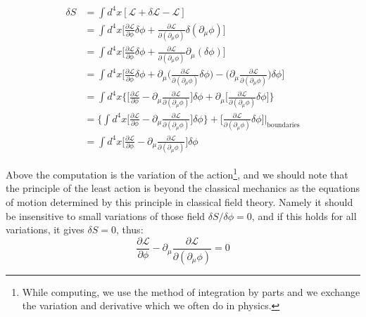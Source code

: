 \documentclass[12pt,openany]{book}
\begin{document}
	\begin{equation}\label{deltaS}
		\begin{aligned}
			\delta S&=\int d^4x [\mathcal{L}+\delta\mathcal{L}-\mathcal{L}]\\
			&=\int d^4x\big[\frac{\partial\mathcal{L}}{\partial\phi}\delta\phi+\frac{\partial \mathcal{L}}{\partial(\partial_\mu\phi)}\delta(\partial_\mu\phi)\big]\\
			&=\int d^4x\big[\frac{\partial\mathcal{L}}{\partial\phi}\delta\phi+\frac{\partial \mathcal{L}}{\partial(\partial_\mu\phi)}\partial_\mu(\delta\phi)   \big]\\
			&=\int d^4x \big[\frac{\partial\mathcal{L}}{\partial\phi}\delta\phi+\partial_\mu\big(\frac{\partial\mathcal{L}}{\partial(\partial_\mu\phi)}\delta\phi\big)-\big(\partial_\mu\frac{\partial\mathcal{L}}{\partial(\partial_\mu\phi)}\big)\delta\phi\big]\\
			&=\int d^4x \{ \big[\frac{\partial\mathcal{L}}{\partial\phi}-\partial_\mu\frac{\partial\mathcal{L}}{\partial(\partial_\mu\phi)}\big]\delta\phi+\partial_\mu\big[\frac{\partial\mathcal{L}}{\partial(\partial_\mu\phi)}\delta\phi\big]\}\\
			&=\{\int d^4x\big[\frac{\partial\mathcal{L}}{\partial\phi}-\partial_\mu\frac{\partial\mathcal{L}}{\partial(\partial_\mu\phi)}\big]\delta\phi\}+\big[\frac{\partial\mathcal{L}}{\partial(\partial_\mu\phi)}\delta\phi\big]\bigg|_{\text{boundaries}}\\
			&=\int d^4x\big[\frac{\partial\mathcal{L}}{\partial\phi}-\partial_\mu\frac{\partial\mathcal{L}}{\partial(\partial_\mu\phi)}\big]\delta\phi
		\end{aligned}
	\end{equation}\par 
	Above the computation is the variation of the action\footnote{While computing, we use the method of integration by parts and we exchange the variation and 
		derivative which we often do in physics.}, and we should note that the principle of the least action is beyond the 
	classical mechanics as the equations of motion determined by this principle in classical field theory. Namely it should be 
	insensitive to small variations of those field $\delta S/\delta \phi=0$, and if this holds for all variations, it gives $\delta S=0$,
	thus:
	\begin{equation}\label{E-L equation}
		\boxed{\frac{\partial\mathcal{L}}{\partial\phi}-\partial_\mu\frac{\partial\mathcal{L}}{\partial(\partial_\mu\phi)}=0}
	\end{equation}\par 
\end{document}
